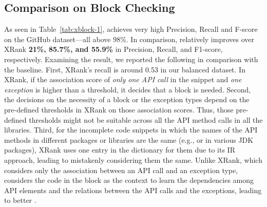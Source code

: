 \subsection{Comparison on  Block Checking}






As seen in Table~\ref{tab:xblock-1}, {\tool} achieves very high
Precision, Recall and F-score on the GitHub dataset---all above
98\%.
In comparison, {\tool} relatively improves over XRank {\bf 21\%, 85.7\%,
and 55.9\%} in Precision, Recall, and F1-score, respectively.
%
Examining the result, we reported the following in comparison with the
baseline.
%
First, XRank's recall is around 0.53 in our balanced dataset. In
XRank, if the association score of {\em only one API call} in the
snippet and {\em one exception} is higher than a threshold, it decides
that a  block is needed.
%
Second, the decisions on the necessity of a  block or
the exception types depend on the pre-defined thresholds in XRank on
those association scores. Thus, those pre-defined thresholds might not
be suitable across all the API method calls in all the
libraries. Third, for the incomplete code snippets in which the names
of the API methods in different packages or libraries are the same
(e.g.,  or  in various JDK packages),
XRank
uses one entry in the dictionary for them due to its IR approach,
leading to mistakenly considering them the same.
%
Unlike XRank, which considers only the association
between an API call and an exception type,
{\tool} considers the code in the block as the context to learn the
dependencies among API elements and the relations between the API
calls and the exceptions, leading to better {\xblock}.


